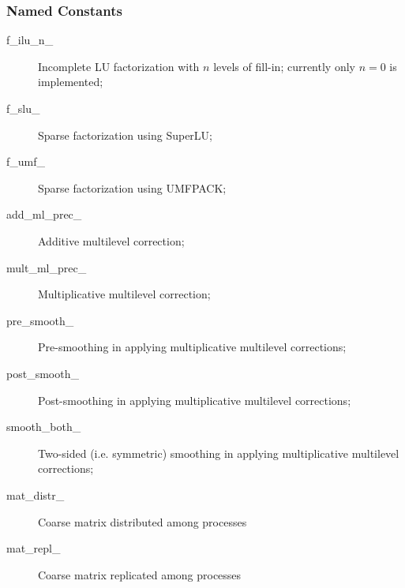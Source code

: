 \subsubsection{Named Constants}
\label{sec:prec_constants}
\begin{description}
\item[f\_ilu\_n\_] Incomplete LU factorization with $n$ levels of
  fill-in; currently only $n=0$ is implemented;
\item[f\_slu\_]  Sparse factorization using SuperLU;
\item[f\_umf\_]  Sparse factorization using UMFPACK;
\item[add\_ml\_prec\_] Additive multilevel correction;
\item[mult\_ml\_prec\_] Multiplicative multilevel correction;
\item[pre\_smooth\_] Pre-smoothing in applying multiplicative
  multilevel corrections;
\item[post\_smooth\_] Post-smoothing in applying multiplicative
  multilevel corrections;
\item[smooth\_both\_] Two-sided (i.e. symmetric) smoothing in applying multiplicative
  multilevel corrections;
\item[mat\_distr\_] Coarse matrix distributed among processes
\item[mat\_repl\_] Coarse matrix replicated among processes
\end{description}


